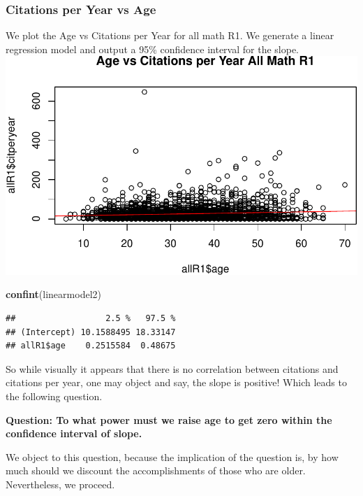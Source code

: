 \documentclass[]{article}
\newenvironment{Shaded}{\begin{snugshade}}{\end{snugshade}}
\newcommand{\KeywordTok}[1]{\textcolor[rgb]{0.13,0.29,0.53}{\textbf{#1}}}
\newcommand{\NormalTok}[1]{#1}
\begin{document}
\hypertarget{citations-per-year-vs-age}{%
\subsubsection{Citations per Year vs
Age}\label{citations-per-year-vs-age}}

We plot the Age vs Citations per Year for all math R1. We generate a
linear regression model and output a 95\% confidence interval for the
slope.
\includegraphics{Response_files/figure-latex/unnamed-chunk-27-1.pdf}

\begin{Shaded}
\begin{Highlighting}[]
\KeywordTok{confint}\NormalTok{(linearmodel2)}
\end{Highlighting}
\end{Shaded}

\begin{verbatim}
##                  2.5 %   97.5 %
## (Intercept) 10.1588495 18.33147
## allR1$age    0.2515584  0.48675
\end{verbatim}

So while visually it appears that there is no correlation between
citations and citations per year, one may object and say, the slope is
positive! Which leads to the following question.

\textbf{Question: To what power must we raise age to get zero within the
confidence interval of slope.}

We object to this question, because the implication of the question is,
by how much should we discount the accomplishments of those who are
older. Nevertheless, we proceed.
\end{document}
